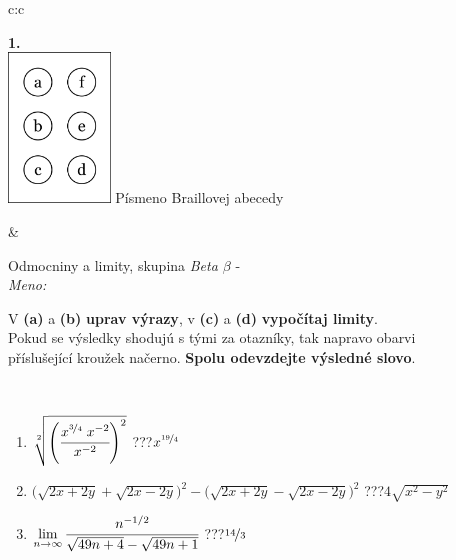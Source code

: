 \documentclass[10pt]{report}
\begin{document}
\begin{tabular}{c:c}
\begin{minipage}[c][104.5mm][t]{0.5\linewidth}
\begin{center}
\begin{minipage}{0.20\linewidth}
\begin{center}
{\Huge\bfseries 1.} \\[2mm]
\includegraphics[height=40mm]{../images/braille.png}
{\small Písmeno Braillovej abecedy}
\end{center}
\end{minipage}
\end{center}
\end{minipage}
&
\begin{minipage}[c][104.5mm][t]{0.5\linewidth}
\begin{center}
\vspace{7mm}
{\huge Odmocniny a limity, skupina \textit{Beta $\beta$} -}\\[5mm]
\textit{Meno:}\phantom{xxxxxxxxxxxxxxxxxxxxxxxxxxxxxxxxxxxxxxxxxxxxxxxxxxxxxxxxxxxxxxxxx}\\[5mm]
\begin{minipage}{0.95\linewidth}
\begin{center}
V \textbf{(a)} a \textbf{(b)} \textbf{uprav výrazy}, v \textbf{(c)} a \textbf{(d)} \textbf{vypočítaj limity}.\\Pokud se výsledky shodujú s tými za otazníky, tak napravo obarvi\\příslušející kroužek načerno. \textbf{Spolu odevzdejte výsledné slovo}.
\end{center}
\end{minipage}
\\[1mm]
\begin{minipage}{0.79\linewidth}
\begin{center}
\begin{varwidth}{\linewidth}
\begin{enumerate}
\small
\item $\sqrt[2]{\left(\cfrac{x^{\nicefrac{3}{4}}\;x^{-2}}{x^{-2}}\right)^{2}}$\quad \dotfill\; ???\;\dotfill \quad $x^{\nicefrac{19}{4}}$
\item {\footnotesize{\scriptsize$\big(\sqrt{2x+2y}+\sqrt{2x-2y}\big)^2-\big(\sqrt{2x+2y}-\sqrt{2x-2y}\big)^2$}\quad \dotfill\; ???\;\dotfill \quad $4\sqrt{x^2-y^2}$}
\item $\lim\limits_{n\to\infty}\cfrac{n^{-1/2}}{\sqrt{49n+4}-\sqrt{49n+1}}$\quad \dotfill\; ???\;\dotfill \quad $\nicefrac{14}{3}$

\end{enumerate}
\end{varwidth}
\end{center}
\end{minipage}
\end{center}
\end{minipage}
\end{tabular}
\end{document}
